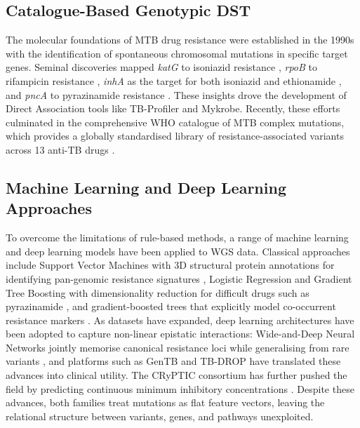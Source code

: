 \documentclass{article}
\theoremstyle{plain}
\theoremstyle{definition}
\theoremstyle{remark}
\begin{document}
\subsection{Catalogue-Based Genotypic DST}
The molecular foundations of MTB drug resistance were established in the 1990s with the identification of spontaneous chromosomal mutations in specific target genes. Seminal discoveries mapped \textit{katG} to isoniazid resistance \citep{zhang1992katg}, \textit{rpoB} to rifampicin resistance \citep{telenti1993rpob}, \textit{inhA} as the target for both isoniazid and ethionamide \citep{banerjee1994inha}, and \textit{pncA} to pyrazinamide resistance \citep{scorpio1996pnca}. These insights drove the development of Direct Association tools like TB-Profiler and Mykrobe. Recently, these efforts culminated in the comprehensive WHO catalogue of MTB complex mutations, which provides a globally standardised library of resistance-associated variants across 13 anti-TB drugs \citep{walker2022who}.

\subsection{Machine Learning and Deep Learning Approaches}
To overcome the limitations of rule-based methods, a range of machine learning and deep learning models have been applied to WGS data. Classical approaches include Support Vector Machines with 3D structural protein annotations for identifying pan-genomic resistance signatures \citep{kavvas2018machine}, Logistic Regression and Gradient Tree Boosting with dimensionality reduction for difficult drugs such as pyrazinamide \citep{kouchaki2019application}, and gradient-boosted trees that explicitly model co-occurrent resistance markers \citep{deelder2019machine}. As datasets have expanded, deep learning architectures have been adopted to capture non-linear epistatic interactions: Wide-and-Deep Neural Networks jointly memorise canonical resistance loci while generalising from rare variants \citep{chen2019beyond}, and platforms such as GenTB \citep{groschel2021gentb} and TB-DROP \citep{wang2024tbdrop} have translated these advances into clinical utility. The CRyPTIC consortium has further pushed the field by predicting continuous minimum inhibitory concentrations \citep{cryptic2022mic}. Despite these advances, both families treat mutations as flat feature vectors, leaving the relational structure between variants, genes, and pathways unexploited.
\end{document}
